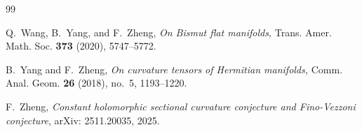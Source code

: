 \documentclass{amsart}
\numberwithin{equation}{section}
\begin{document}
\begin{thebibliography}{99}

 Q.~Wang, B.~Yang, and F.~Zheng, \emph{On Bismut flat manifolds,} Trans. Amer. Math. Soc. {\bf 373} (2020), 5747--5772.

 B.~Yang and F.~Zheng, \emph{On curvature tensors of Hermitian manifolds,} Comm. Anal. Geom. {\bf 26} (2018), no.~5, 1193--1220.











 F.~Zheng, \emph{Constant holomorphic sectional curvature conjecture and
Fino-Vezzoni conjecture}, arXiv: 2511.20035, 2025.

\end{thebibliography}
\end{document}
